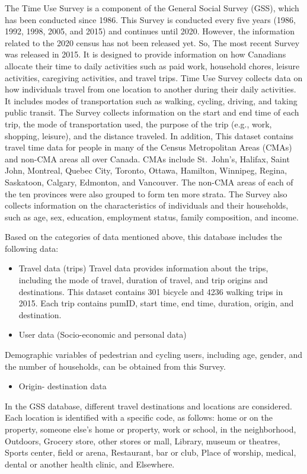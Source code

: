 \documentclass[12pt,twoside]{reedthesis}
\providecommand{\tightlist}{%
  \setlength{\itemsep}{0pt}\setlength{\parskip}{0pt}}
\begin{document}
The Time Use Survey is a component of the General Social Survey (GSS), which has been conducted since 1986. This Survey is conducted every five years (1986, 1992, 1998, 2005, and 2015) and continues until 2020. However, the information related to the 2020 census has not been released yet. So, The most recent Survey was released in 2015. It is designed to provide information on how Canadians allocate their time to daily activities such as paid work, household chores, leisure activities, caregiving activities, and travel trips. Time Use Survey collects data on how individuals travel from one location to another during their daily activities. It includes modes of transportation such as walking, cycling, driving, and taking public transit. The Survey collects information on the start and end time of each trip, the mode of transportation used, the purpose of the trip (e.g., work, shopping, leisure), and the distance traveled. In addition, This dataset contains travel time data for people in many of the Census Metropolitan Areas (CMAs) and non-CMA areas all over Canada. CMAs include St.~John's, Halifax, Saint John, Montreal, Quebec City, Toronto, Ottawa, Hamilton, Winnipeg, Regina, Saskatoon, Calgary, Edmonton, and Vancouver. The non-CMA areas of each of the ten provinces were also grouped to form ten more strata. The Survey also collects information on the characteristics of individuals and their households, such as age, sex, education, employment status, family composition, and income.

Based on the categories of data mentioned above, this database includes the following data:
\begin{itemize}
\item
  Travel data (trips) Travel data provides information about the trips, including the mode of travel, duration of travel, and trip origins and destinations. This dataset contains 301 bicycle and 4236 walking trips in 2015. Each trip contains pumID, start time, end time, duration, origin, and destination.
\item
  User data (Socio-economic and personal data)
\end{itemize}
Demographic variables of pedestrian and cycling users, including age, gender, and the number of households, can be obtained from this Survey.
\begin{itemize}
\tightlist
\item
  Origin- destination data
\end{itemize}
In the GSS database, different travel destinations and locations are considered. Each location is identified with a specific code, as follows: home or on the property, someone else's home or property, work or school, in the neighborhood, Outdoors, Grocery store, other stores or mall, Library, museum or theatres, Sports center, field or arena, Restaurant, bar or club, Place of worship, medical, dental or another health clinic, and Elsewhere.
\end{document}
